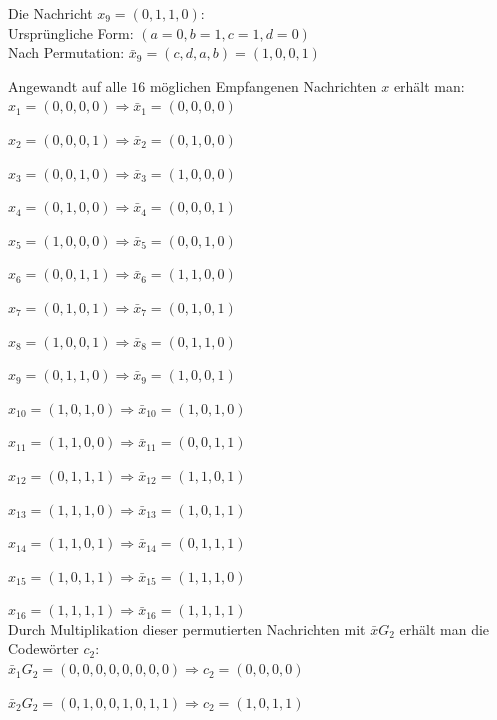 \begin{Beispiel}
    Die Nachricht $x_9= (0,1,1,0):$\\
    Ursprüngliche Form: $(a=0, b=1, c=1, d=0)$\\
    Nach Permutation: $\bar{x}_{9}=(c,d,a,b)=(1,0,0,1)$\\
    \pagebreak

    Angewandt auf alle $16$ möglichen Empfangenen Nachrichten $x$ erhält man:\\
    
    $x_1= (0,0,0,0) \Rightarrow \bar{x}_{1} = (0,0,0,0)$
    
    $x_2= (0,0,0,1) \Rightarrow \bar{x}_{2} = (0,1,0,0)$
    
    $x_3= (0,0,1,0) \Rightarrow \bar{x}_{3} = (1,0,0,0)$
    
    $x_4= (0,1,0,0) \Rightarrow \bar{x}_{4} = (0,0,0,1)$
    
    $x_5= (1,0,0,0) \Rightarrow \bar{x}_{5} = (0,0,1,0)$
    
    $x_6= (0,0,1,1) \Rightarrow \bar{x}_{6} = (1,1,0,0)$
    
    $x_7= (0,1,0,1) \Rightarrow \bar{x}_{7} = (0,1,0,1)$
    
    $x_8= (1,0,0,1) \Rightarrow \bar{x}_{8} = (0,1,1,0)$
    
    $x_9= (0,1,1,0) \Rightarrow \bar{x}_{9} = (1,0,0,1)$
    
    $x_{10}= (1,0,1,0) \Rightarrow \bar{x}_{10} = (1,0,1,0)$
    
    $x_{11}= (1,1,0,0) \Rightarrow \bar{x}_{11} = (0,0,1,1)$
    
    $x_{12}= (0,1,1,1) \Rightarrow \bar{x}_{12} = (1,1,0,1)$
    
    $x_{13}= (1,1,1,0) \Rightarrow \bar{x}_{13} = (1,0,1,1)$
    
    $x_{14}= (1,1,0,1) \Rightarrow \bar{x}_{14} = (0,1,1,1)$
    
    $x_{15}= (1,0,1,1) \Rightarrow \bar{x}_{15} = (1,1,1,0)$
    
    $x_{16}= (1,1,1,1) \Rightarrow \bar{x}_{16} = (1,1,1,1)$\\
    
    Durch Multiplikation dieser permutierten Nachrichten mit  $\bar{x}G_2$ erhält man die Codewörter $c_2$:\\
    
    $\bar{x}_{1}G_2= (0,0,0,0,0,0,0,0) \Rightarrow c_2= (0,0,0,0)$
    
    $\bar{x}_{2}G_2= (0,1,0,0,1,0,1,1) \Rightarrow c_2= (1,0,1,1)$
    

\end{Beispiel}
